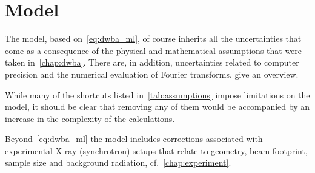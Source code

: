 \documentclass[10pt,twoside, b5paper,pdftex]{report}
\begin{document}
\section{Model}
The model, based on~\cref{eq:dwba_ml}, of course inherits all the uncertainties that come as a consequence of the physical and mathematical assumptions that were taken in~\cref{chap:dwba}. There are, in addition, uncertainties related to computer precision and the numerical evaluation of Fourier transforms.  give an overview.
%
\begin{table}[htbp]
\caption{An overview of the numerical compromises inherited by the computer model that lead to uncertainties.  \label{tab:numassumptions}}
\begin{center}
\end{center}
\end{table}
%
While many of the shortcuts listed in~\cref{tab:assumptions} impose limitations on the model, it should be clear that removing any of them would be accompanied by an increase in the complexity of the calculations.

Beyond~\cref{eq:dwba_ml} the model includes corrections associated with experimental X-ray (synchrotron) setups that relate to geometry, beam footprint, sample size and background radiation, cf.~\cref{chap:experiment}.  


% 
\end{document}
